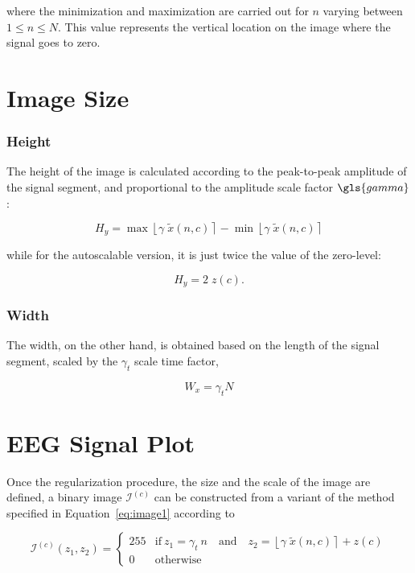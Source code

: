 \noindent where the minimization and maximization are carried out for $n$ varying between ${1 \leq n\leq N}$. This value represents the vertical location on the image where the signal goes to zero.  

\section{Image Size}

\subsubsection{Height}

The height of the image is calculated according to the peak-to-peak amplitude of the signal segment, and proportional to the amplitude scale factor $\gls{gamma}$:

\begin{equation}
H_y = \max \left\lfloor \gamma \; \tilde{x}(n,c) \right\rceil  - \min \left\lfloor \gamma \; \tilde{x}(n,c) \right\rceil 
\label{eq:height}
\end{equation}

\noindent while for the autoscalable version, it is just twice the value of the zero-level:

\begin{equation}
H_y = 2 \; z(c) .
\label{eq:autoscaleheight}
\end{equation}


\subsubsection{Width}

The width, on the other hand, is obtained based on the length of the signal segment, scaled by the $\gamma_t$  scale time factor,

\begin{equation}
W_x = \gamma_t  N
\label{eq:width}
\end{equation}

\section{EEG Signal Plot}
\label{Plot}

Once the regularization procedure,  the size and the scale of the image are defined,  a binary image $\mathcal{I}^{(c)}$ can be constructed from a variant of the method specified in Equation~\ref{eq:image1} according to

\begin{equation}
\mathcal{I}^{(c)}(z_1,z_2) = \left\{ \begin{array}{rl}
255 & \text{if} \   z_1 = \gamma_{t} \  n \quad \text{and}  \quad z_2 = \left\lfloor \gamma \; \tilde{x}(n,c) \right\rceil + z(c) \\
0   & \mbox{otherwise}
\end{array}\right.
\label{eq:images}
\end{equation}

